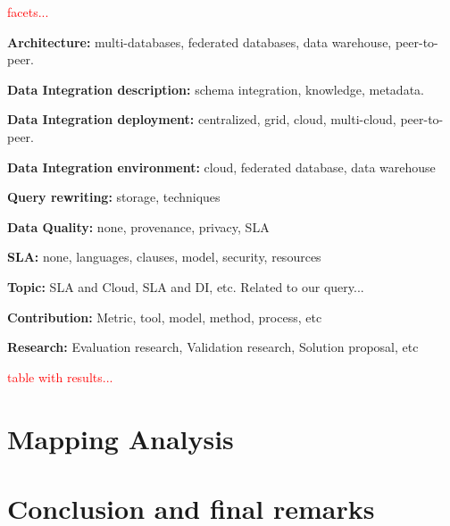 \documentclass[preprint,12pt]{elsarticle}
\theoremstyle{plain}
\theoremstyle{plain}
\theoremstyle{plain}
\theoremstyle{plain}
\begin{document}
\textcolor{red}{facets...}

\begin{description}
\item \textbf{Architecture:} multi-databases, federated databases, data warehouse, peer-to-peer.
\item \textbf{Data Integration description:} schema integration, knowledge, metadata.
\item \textbf{Data Integration deployment:} centralized, grid, cloud, multi-cloud, peer-to-peer.
\item \textbf{Data Integration environment:} cloud, federated database, data warehouse
\item \textbf{Query rewriting:} storage, techniques 
\item \textbf{Data Quality:} none, provenance, privacy, SLA
\item \textbf{SLA:} none, languages, clauses, model, security, resources
\item \textbf{Topic: } SLA and Cloud, SLA and DI, etc. Related to our query...
\item \textbf{Contribution:} Metric, tool, model, method, process, etc
\item \textbf{Research:} Evaluation research, Validation research, Solution proposal, etc
\end{description}

\textcolor{red}{table with results...}


\section{Mapping Analysis}

\section{Conclusion and final remarks}



 
\end{document}
